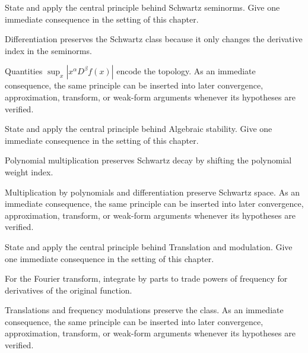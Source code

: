 \begin{exercise}\label{exr:iii14-02}
State and apply the central principle behind Schwartz seminorms. Give one immediate consequence in the setting of this chapter.
\end{exercise}
\begin{hint}
Differentiation preserves the Schwartz class because it only changes the derivative index in the seminorms.
\end{hint}
\begin{solution}
Quantities $\sup_x|x^\alpha D^\beta f(x)|$ encode the topology. As an immediate consequence, the same principle can be inserted into later convergence, approximation, transform, or weak-form arguments whenever its hypotheses are verified.
\end{solution}

\begin{exercise}\label{exr:iii14-03}
State and apply the central principle behind Algebraic stability. Give one immediate consequence in the setting of this chapter.
\end{exercise}
\begin{hint}
Polynomial multiplication preserves Schwartz decay by shifting the polynomial weight index.
\end{hint}
\begin{solution}
Multiplication by polynomials and differentiation preserve Schwartz space. As an immediate consequence, the same principle can be inserted into later convergence, approximation, transform, or weak-form arguments whenever its hypotheses are verified.
\end{solution}

\begin{exercise}\label{exr:iii14-04}
State and apply the central principle behind Translation and modulation. Give one immediate consequence in the setting of this chapter.
\end{exercise}
\begin{hint}
For the Fourier transform, integrate by parts to trade powers of frequency for derivatives of the original function.
\end{hint}
\begin{solution}
Translations and frequency modulations preserve the class. As an immediate consequence, the same principle can be inserted into later convergence, approximation, transform, or weak-form arguments whenever its hypotheses are verified.
\end{solution}

